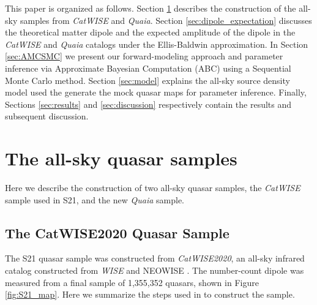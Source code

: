 \documentclass[modern]{aastex631}
\newcommand{\catwise}{\textsl{CatWISE}\xspace}
\newcommand{\catwisetwentytwenty}{\textsl{CatWISE2020}\xspace}
\newcommand{\quaia}{\textsl{Quaia}\xspace}
\newcommand{\wise}{\textsl{WISE}\xspace}
\begin{document}

This paper is organized as follows.
Section \ref{sec:data} describes the construction of the all-sky samples from \catwise and \quaia.
Section \ref{sec:dipole_expectation} discusses the theoretical matter dipole and the expected amplitude of the dipole in the \catwise and \quaia catalogs under the Ellis-Baldwin approximation.
In Section \ref{sec:AMCSMC} we present our forward-modeling approach and parameter inference via Approximate Bayesian Computation (ABC) using a Sequential Monte Carlo method.
Section \ref{sec:model} explains the all-sky source density model used the generate the mock quasar maps for parameter inference.
Finally, Sections \ref{sec:results} and \ref{sec:discussion} respectively contain the results and subsequent discussion.


\section{The all-sky quasar samples}
\label{sec:data}

Here we describe the construction of two all-sky quasar samples, the \catwise sample used in S21, and the new \quaia sample.

\subsection{The CatWISE2020 Quasar Sample}
\label{sec:catwise}
The S21 quasar sample was constructed from \catwisetwentytwenty, an all-sky infrared catalog constructed from \wise and NEOWISE \citep{marocco_catwise2020_2021}.
The number-count dipole was measured from a final sample of 1,355,352 quasars, shown in Figure \ref{fig:S21_map}.
Here we summarize the steps used in \citet{secrest_test_2021} to construct the sample.
\end{document}
